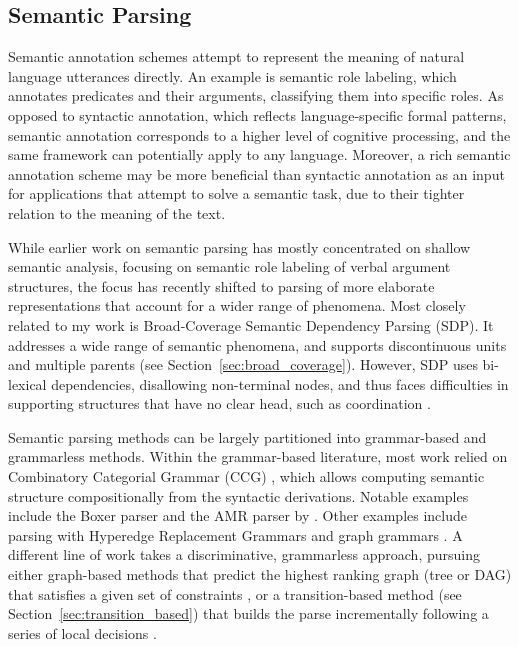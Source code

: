\documentclass[11pt]{article}
\newcommand{\secref}[1]{Section~\ref{#1}}
\begin{document}
\subsection{Semantic Parsing}

Semantic annotation schemes attempt to represent the meaning of natural
language utterances directly. An example is semantic role
labeling\cite{baker1998framenet}\cite{paass2014semantic}, which annotates
predicates and their arguments, classifying them into specific roles. As
opposed to syntactic annotation, which reflects language-specific formal
patterns, semantic annotation corresponds to a higher level of cognitive
processing, and the same framework can potentially apply to any language.
Moreover, a rich semantic annotation scheme may be more beneficial than
syntactic annotation as an input for applications that attempt to solve a
semantic task, due to their tighter relation to the meaning of the text.

While earlier work on semantic parsing has mostly concentrated on shallow semantic analysis,
focusing on semantic role labeling of verbal argument structures,
the focus has recently shifted to parsing of more elaborate representations that account
for a wider range of phenomena. 
Most closely related to my work is Broad-Coverage Semantic Dependency Parsing (SDP).
It addresses a wide range of semantic phenomena,
and supports discontinuous units and multiple parents
(see \secref{sec:broad_coverage}).
However, SDP uses
bi-lexical dependencies, disallowing non-terminal nodes, and thus faces difficulties in supporting
structures that have no clear head, such as coordination \cite{Ivanova2012who}.

Semantic parsing methods can be largely partitioned into grammar-based and grammarless methods.
Within the grammar-based literature, most work relied on Combinatory Categorial Grammar (CCG)
\cite{Steedman:00}, which allows computing semantic structure compositionally from the
syntactic derivations. Notable examples include the Boxer parser \cite{bos2005towards}
and the AMR parser by \cite{artzi2015broad}.
Other examples include parsing with Hyperedge Replacement Grammars
\cite{jones2012semantics,chiang2013parsing,peng2015synchronous} and
graph grammars \cite{koller2015semantic}.
A different line of work takes a discriminative, grammarless approach,
pursuing either graph-based methods that predict the highest ranking graph
(tree or DAG) that satisfies a given set of constraints
\cite[for AMR parsing]{flanigan2014discriminative},
or a transition-based method (see \secref{sec:transition_based})
that builds the parse incrementally following a series of local
decisions \cite[and much subsequent work]{Nivre03anefficient}.
\end{document}
